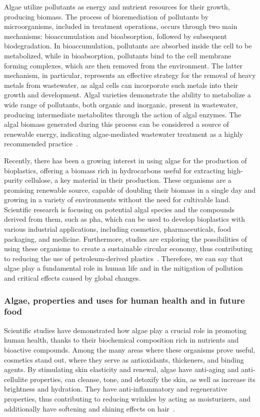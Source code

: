 Algae utilize pollutants as energy and nutrient resources for their growth, producing biomass. The process of bioremediation of pollutants by microorganisms, included in treatment operations, occurs through two main mechanisms: bioaccumulation and bioabsorption, followed by subsequent biodegradation. In bioaccumulation, pollutants are absorbed inside the cell to be metabolized, while in bioabsorption, pollutants bind to the cell membrane forming complexes, which are then removed from the environment. The latter mechanism, in particular, represents an effective strategy for the removal of heavy metals from wastewater, as algal cells can incorporate such metals into their growth and development. Algal varieties demonstrate the ability to metabolize a wide range of pollutants, both organic and inorganic, present in wastewater, producing intermediate metabolites through the action of algal enzymes. The algal biomass generated during this process can be considered a source of renewable energy, indicating algae-mediated wastewater treatment as a highly recommended practice~\parencite{bhatt_Algae_2022}.

Recently, there has been a growing interest in using algae for the production of bioplastics, offering a biomass rich in hydrocarbons useful for extracting high-purity cellulose, a key material in their production. These organisms are a promising renewable source, capable of doubling their biomass in a single day and growing in a variety of environments without the need for cultivable land. Scientific research is focusing on potential algal species and the compounds derived from them, such as \gls{pha}, which can be used to develop bioplastics with various industrial applications, including cosmetics, pharmaceuticals, food packaging, and medicine. Furthermore, studies are exploring the possibilities of using these organisms to create a sustainable circular economy, thus contributing to reducing the use of petroleum-derived plastics~\parencite{dang_Current_2022}. Therefore, we can say that algae play a fundamental role in human life and in the mitigation of pollution and critical effects caused by global changes.


\subsubsection{Algae, properties and uses for human health and in future food}
Scientific studies have demonstrated how algae play a crucial role in promoting human health, thanks to their biochemical composition rich in nutrients and bioactive compounds. Among the many areas where these organisms prove useful, cosmetics stand out, where they serve as antioxidants, thickeners, and binding agents. By stimulating skin elasticity and renewal, algae have anti-aging and anti-cellulite properties, can cleanse, tone, and detoxify the skin, as well as increase its brightness and hydration. They have anti-inflammatory and regenerative properties, thus contributing to reducing wrinkles by acting as moisturizers, and additionally have softening and shining effects on hair~\parencite{garima_diverse_2015}.


